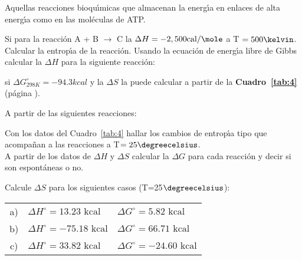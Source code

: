 \subsubsection{} Aquellas reacciones
bioqu\'{\i}micas que almacenan la energ\'{\i}a en enlaces de alta energ\'{\i}a como en las
mol\'eculas de ATP.

\newpage
\begin{exercises}

\exer Si para la reacci\'on A + B
$\longrightarrow$ C la
$\Delta H = -2,500 \mathrm{cal}/\mole$ a   T $= 500 \kelvin$. Calcular la entrop\'{\i}a de la reacci\'on.
\exer Usando la ecuaci\'on de energ\'{\i}a libre de
Gibbs calcular la
$\Delta H$ para la si\-guiente reacci\'on:


si $\Delta G^\circ_{298K} = -94.3 kcal$ y la $\Delta S$ la puede calcular a partir de la
\textbf{Cuadro~\ref{tab:4}} (p\'agina \pageref{tab:4}).

\exer A partir de las siguientes reacciones:
 \subexer  Con los datos del Cuadro~\ref{tab:4}  hallar los cambios de entrop\'{\i}a tipo que acompa\~nan a las reacciones
 a T$= 25\degreecelsius$.\\
\subexer A partir de los datos de $\Delta H$ y $\Delta S$
calcular la $\Delta G$ para cada reacci\'on y decir si son espont\'aneas o no.
 
\exer Calcule $\Delta S$ para los siguientes casos
(T=25$\degreecelsius$):\\
\begin{tabular}{cll}
a)&$\Delta H^\circ = 13.23 \textrm{ kcal}$ &$\Delta G^\circ=5.82\textrm{ kcal}$\\
 b)&$\Delta H^\circ = -75.18 \textrm{ kcal}$ &$\Delta G^\circ=66.71 \textrm{ kcal}$\\
c)&$\Delta H^\circ = 33.82 \textrm{ kcal}$&$\Delta G^\circ=-24.60 \textrm{ kcal}$\\
\end{tabular}
\end{exercises}



